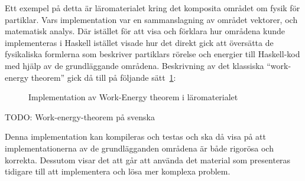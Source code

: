 \begin{draft}
Ett exempel på detta är läromaterialet kring det komposita området om fysik för
partiklar. Vars implementation var en sammanslagning av området vektorer, och
matematisk analys. Där istället för att visa och förklara hur områdena kunde
implementeras i Haskell istället visade hur det direkt gick att översätta de
fysikaliska formlerna som beskriver partiklars rörelse och energier till
Haskell-kod med hjälp av de grundläggande områdena. Beskrivning av det klassiska
``work-energy theorem'' gick då till på följande sätt~\ref{fig:komposit-ex}:

\begin{figure}[tph]
  \centering
  \caption{Implementation av Work-Energy theorem i läromaterialet}
  \label{fig:komposit-ex}
\end{figure}

TODO: Work-energy-theorem på svenska

Denna implementation kan kompileras och testas och ska då visa på att
implementationerna av de grundlägganden områdena är både rigorösa och korrekta.
Dessutom visar det att går att använda det material som presenteras tidigare
till  att implementera och lösa mer komplexa problem.

\end{draft}

